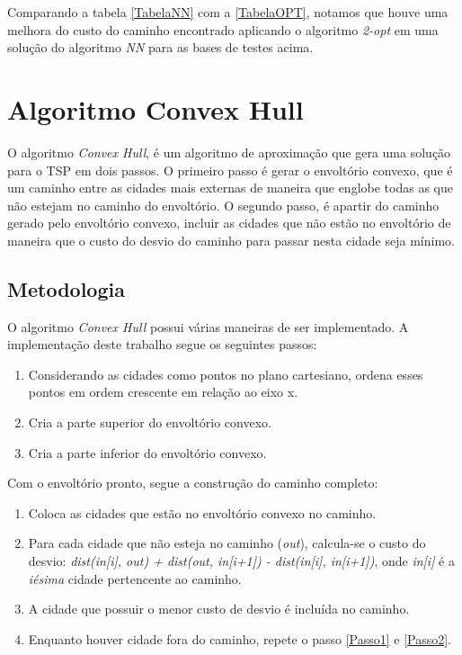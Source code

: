 \documentclass[a4paper,12pt]{article}
\begin{document}
Comparando a tabela \ref{TabelaNN} com a \ref{TabelaOPT}, notamos que houve uma melhora do custo do caminho encontrado 
aplicando o algoritmo \emph{2-opt} em uma solução do algoritmo \emph{NN} para as bases de testes acima.



\section{Algoritmo Convex Hull}
O algoritmo \emph{Convex Hull}, é um algoritmo de aproximação que gera uma solução para o TSP em dois passos. O primeiro 
passo é gerar o envoltório convexo, que é um caminho entre as cidades mais externas de maneira que englobe todas as que não 
estejam no caminho do envoltório. O segundo passo, é apartir do caminho gerado pelo envoltório convexo, incluir as cidades que 
não estão no envoltório de maneira que o custo do desvio do caminho para passar nesta cidade seja mínimo.



\subsection{Metodologia}
O algoritmo \emph{Convex Hull} possui várias maneiras de ser implementado. A implementação deste trabalho segue os seguintes
passos:

\begin{enumerate}
\item Considerando as cidades como pontos no plano cartesiano, ordena esses pontos em ordem crescente em relação ao eixo x.
\item Cria a parte superior do envoltório convexo.
\item Cria a parte inferior do envoltório convexo.
\end{enumerate}

Com o envoltório pronto, segue a construção do caminho completo:

\begin{enumerate}
\item Coloca as cidades que estão no envoltório convexo no caminho.
\item \label{Passo1} Para cada cidade que não esteja no caminho (\textit{out}), calcula-se o custo do desvio: \textit{dist(in[i], out) + dist(out, in[i+1]) - dist(in[i], in[i+1])}, onde \textit{in[i]} é a \textit{iésima} cidade pertencente ao caminho.
\item A cidade que possuir o menor custo de desvio é incluída no caminho. \label{Passo2}
\item Enquanto houver cidade fora do caminho, repete o passo \ref{Passo1} e \ref{Passo2}.
\end{enumerate}
\end{document}
